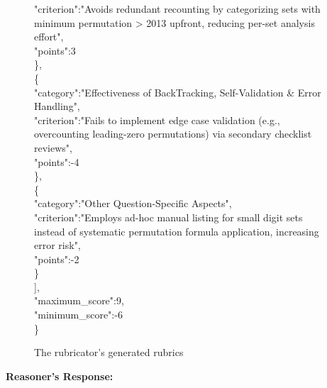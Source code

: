 \begin{figure}[!ht]
\begin{lrbox}{\DSRPrompt}
\begin{promptbox}
\hspace{6em}"criterion":"Avoids redundant recounting by categorizing sets with minimum permutation > 2013 upfront, reducing per-set analysis effort",\\
\hspace{6em}"points":3\\
\hspace{4em}\},\\
\hspace{4em}\{\\
\hspace{6em}"category":"Effectiveness of BackTracking, Self-Validation \& Error Handling",\\
\hspace{6em}"criterion":"Fails to implement edge case validation (e.g., overcounting leading-zero permutations) via secondary checklist reviews",\\
\hspace{6em}"points":-4\\
\hspace{4em}\},\\
\hspace{4em}\{\\
\hspace{6em}"category":"Other Question-Specific Aspects",\\
\hspace{6em}"criterion":"Employs ad-hoc manual listing for small digit sets instead of systematic permutation formula application, increasing error risk",\\
\hspace{6em}"points":-2\\
\hspace{4em}\}\\
\hspace{2em}],\\
\hspace{2em}"maximum\_score":9,\\
\hspace{2em}"minimum\_score":-6\\
\}
    \end{promptbox}
    \end{lrbox}
    \usebox{\DSRPrompt}
    \caption{The rubricator's generated rubrics}
    \label{fig:evaluation-prompts}
\end{figure}


\clearpage
\textbf{Reasoner's Response:}

